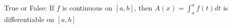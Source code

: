 \documentclass{ximera}
\author{Steven Gubkin}
\begin{document}
\begin{exercise}

True or False:  If $f$ is continuous on $[a,b]$, then $A(x) = \int_a^x f(t) dt$ is differentiable on $[a,b]$


\begin{prompt}
	\begin{multipleChoice}
	\end{multipleChoice}
\end{prompt}

\end{exercise}
\end{document}
